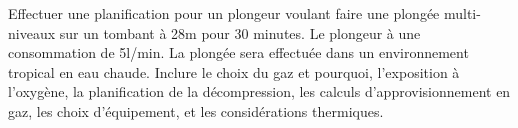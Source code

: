 \documentclass[english,12pt,a4paper]{article}
\begin{document}
\begin{outline}
		\1 Effectuer une planification pour un plongeur voulant faire une plongée multi-niveaux sur un tombant à 28m pour 30 minutes. Le plongeur à une consommation de 5l/min. La plongée sera effectuée dans un environnement tropical en eau chaude. Inclure le choix du gaz et pourquoi, l'exposition à l'oxygène, la planification de la décompression, les calculs d'approvisionnement en gaz, les choix d'équipement, et les considérations thermiques.
			\2 \hspace{-2em}\hrulefill
			\2 \hspace{-2em}\hrulefill
			\2 \hspace{-2em}\hrulefill
			\2 \hspace{-2em}\hrulefill
			\2 \hspace{-2em}\hrulefill
			\2 \hspace{-2em}\hrulefill
			\2 \hspace{-2em}\hrulefill
			\2 \hspace{-2em}\hrulefill
	\end{outline}
	\pagebreak

\end{document}
